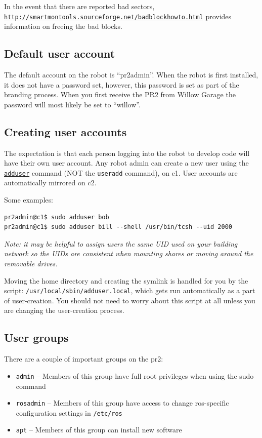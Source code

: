 In the event that there are reported bad sectors,
\texttt{\href{http://smartmontools.sourceforge.net/badblockhowto.html}{http://smartmontools.sourceforge.net/badblockhowto.html}}
provides information on freeing the bad blocks.

\subsection{Default user account}
The default account on the robot is ``pr2admin''.  When the robot is
first installed, it does not have a password set, however, this
password is set as part of the branding process.  When you first
receive the PR2 from Willow Garage the password will most likely be
set to ``willow''.

\subsection{Creating user accounts}
The expectation is that each person logging into the robot to develop
code will have their own user account.  Any robot admin can create a
new user using the
\texttt{\href{http://unixhelp.ed.ac.uk/CGI/man-cgi?adduser}{adduser}}
command (NOT the \texttt{useradd} command), on c1.  User accounts are
automatically mirrored on c2.

Some examples:
\begin{verbatim}
pr2admin@c1$ sudo adduser bob
pr2admin@c1$ sudo adduser bill --shell /usr/bin/tcsh --uid 2000
\end{verbatim}

\textit{Note: it may be helpful to assign users the same UID used on
  your building network so the UIDs are consistent when mounting shares
  or moving around the removable drives.}

Moving the home directory and creating the symlink is handled for you
by the script: \texttt{/usr/local/sbin/adduser.local}, which gets run
automatically as a part of user-creation.  You should not need to
worry about this script at all unless you are changing the
user-creation process.

\subsection{User groups}
There are a couple of important groups on the pr2:
\begin{itemize}
\item \texttt{admin} -- Members of this group have full root privileges when using the sudo command
\item \texttt{rosadmin} -- Members of this group have access to change ros-specific configuration settings in \texttt{/etc/ros}
\item \texttt{apt} -- Members of this group can install new software
\end{itemize}

